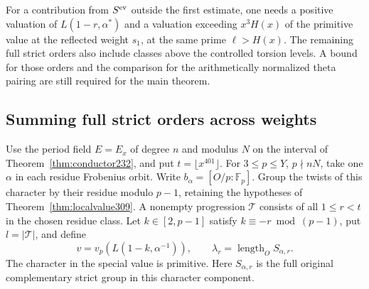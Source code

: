 \documentclass[a4paper,11pt]{article}
\theoremstyle{definition}
\theoremstyle{remark}
\numberwithin{equation}{section}
\begin{document}
For a contribution from \(S^{\rm ev}\) outside the first estimate,
one needs a positive valuation of \(L(1-r,\alpha^*)\) and
a valuation exceeding \(x^3H(x)\) of the primitive value at
the reflected weight \(s_1\), at the same prime \(\ell>H(x)\).
The remaining full strict orders also include classes above
the controlled torsion levels. A bound for those orders and
the comparison for the arithmetically normalized theta pairing
are still required for the main theorem.

\subsection{Summing full strict orders across weights}\label{nav:II-74}
Use the period field \(E=E_x\) of degree \(n\) and modulus \(N\)
on the interval of Theorem~\ref{thm:conductor232}, and put
\(t=\lfloor x^{401}\rfloor\). For \(3\le p\le Y\), \(p\nmid nN\),
take one \(\alpha\) in each residue Frobenius orbit. Write
\(b_\alpha=[O/p:\mathbb F_p]\). Group the twists of this character
by their residue modulo \(p-1\), retaining the hypotheses
of Theorem~\ref{thm:localvalue309}. A nonempty progression
\(\mathcal T\) consists of all \(1\le r<t\) in the chosen
residue class. Let \(k\in[2,p-1]\) satisfy \(k\equiv-r\bmod(p-1)\),
put \(l=|\mathcal T|\), and define
\[
 v=v_p(L(1-k,\alpha^{-1})),\qquad
 \lambda_r=\operatorname{length}_O S_{\alpha,r}.
\]
The character in the special value is primitive. Here
\(S_{\alpha,r}\) is the full original complementary strict group
in this character component.
\end{document}
